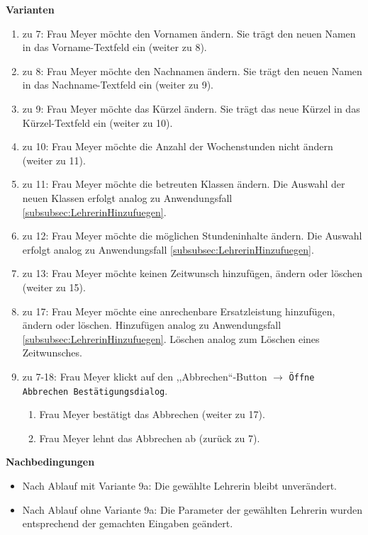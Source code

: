 \documentclass[fontsize=12pt,paper=a4,twoside]{scrartcl}
\begin{document}
\textbf{Varianten}
\begin{enumerate}
\item zu 7: Frau Meyer möchte den Vornamen ändern. Sie trägt den neuen Namen in das Vorname-Textfeld ein (weiter zu 8).
\item zu 8: Frau Meyer möchte den Nachnamen ändern. Sie trägt den neuen Namen in das Nachname-Textfeld ein (weiter zu 9).
\item zu 9: Frau Meyer möchte das Kürzel ändern. Sie trägt das neue Kürzel in das Kürzel-Textfeld ein (weiter zu 10).
\item zu 10: Frau Meyer möchte die Anzahl der Wochenstunden nicht ändern (weiter zu 11).
\item zu 11: Frau Meyer möchte die betreuten Klassen ändern. Die Auswahl der neuen Klassen erfolgt
	analog zu Anwendungsfall \ref{subsubsec:LehrerinHinzufuegen}.
\item zu 12: Frau Meyer möchte die möglichen Stundeninhalte ändern. Die Auswahl erfolgt analog zu Anwendungsfall \ref{subsubsec:LehrerinHinzufuegen}.
\item zu 13: Frau Meyer möchte keinen Zeitwunsch hinzufügen, ändern oder löschen (weiter zu 15).
\item zu 17: Frau Meyer möchte eine anrechenbare Ersatzleistung hinzufügen, ändern oder löschen. Hinzufügen analog zu Anwendungsfall \ref{subsubsec:LehrerinHinzufuegen}. Löschen analog zum Löschen eines Zeitwunsches.
\item zu 7-18: Frau Meyer klickt auf den ,,Abbrechen``-Button $\rightarrow$ \texttt{Öffne Abbrechen Bestätigungsdialog}.
	\begin{enumerate}[label={\alph*.}]
	\item Frau Meyer bestätigt das Abbrechen (weiter zu 17).
	\item Frau Meyer lehnt das Abbrechen ab (zurück zu 7).
	\end{enumerate}
\end{enumerate}
\vspace{5pt}

\textbf{Nachbedingungen}
\begin{itemize}
\item Nach Ablauf mit Variante 9a: Die gewählte Lehrerin bleibt unverändert.
\item Nach Ablauf ohne Variante 9a: Die Parameter der gewählten Lehrerin wurden entsprechend der gemachten Eingaben geändert.
\end{itemize}
\vspace{5pt}
\end{document}
